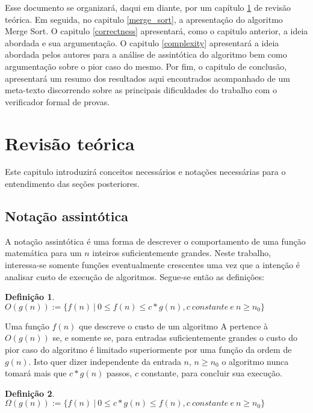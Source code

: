 \documentclass[12pt]{article}
\theoremstyle{definition}
\newtheorem{definition}{Definição}[section]
\begin{document}
Esse documento se organizará, daqui em diante, por um capítulo \ref{explaining} de revisão teórica. Em seguida, no capitulo \ref{merge_sort}, a apresentação do algoritmo Merge Sort.
O capitulo \ref{correctness} apresentará, como o capitulo anterior, a ideia abordada
e sua argumentação. 
O capitulo \ref{complexity} apresentará a ideia abordada pelos autores para a análise de assintótica do algoritmo
bem como argumentação sobre o pior caso do mesmo. Por fim, o capitulo de conclusão, apresentará um resumo dos resultados aqui encontrados acompanhado de um meta-texto discorrendo sobre
as principais dificuldades do trabalho com o verificador formal de provas.

\section{Revisão teórica}
\label{explaining}

Este capitulo introduzirá conceitos necessários e notações necessárias para o entendimento das seções posteriores.

\subsection{Notação assintótica}

A notação assintótica é uma forma de descrever o comportamento de uma função matemática para um $n$ inteiros suficientemente
grandes. Neste trabalho, interessa-se somente funções eventualmente crescentes uma vez que a intenção é analisar custo de execução
de algoritmos. Segue-se então as definições:

\theoremstyle{definition}
\begin{definition}
        $O(g(n)) := \{f(n)\ |\ 0 \leq f(n) \leq c * g(n), c\ constante\ e\ n \geq n_0\}$        
\end{definition}

Uma função $f(n)$ que descreve o custo de um algoritmo A pertence à $O(g(n))$ se, e somente se, para entradas 
suficientemente grandes o custo do pior caso do algoritmo é limitado superiormente por uma função da ordem de $g(n)$.
Isto quer dizer independente da entrada $n$, $n \geq n_0$  o algoritmo nunca tomará mais que $c * g(n)$ passos, $c$ constante, para concluir
sua execução.

\theoremstyle{definition}
\begin{definition}
        $\Omega(g(n)) := \{f(n)\ |\ 0 \leq c * g(n) \leq f(n), c\ constante\ e\ n \geq n_0\}$        
\end{definition}
\end{document}

